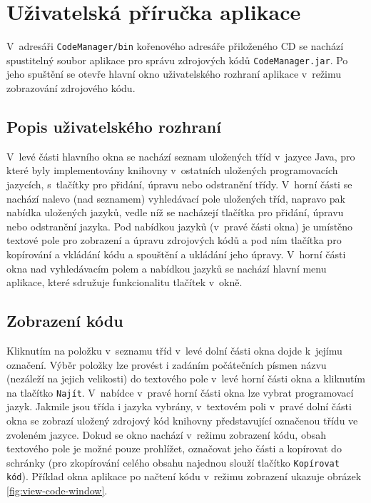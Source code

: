 \documentclass[czech,BP]{thesiskiv}
\begin{document}
    

\chapter{Uživatelská příručka aplikace}
V~adresáři \texttt{CodeManager/bin} kořenového adresáře přiloženého CD se nachází spustitelný soubor aplikace pro správu zdrojových kódů \texttt{CodeManager.jar}. Po jeho spuštění se otevře hlavní okno uživatelského rozhraní aplikace v~režimu zobrazování zdrojového kódu.\par

\section{Popis uživatelského rozhraní}
V~levé části hlavního okna se nachází seznam uložených tříd v~jazyce Java, pro které byly implementovány knihovny v~ostatních uložených programovacích jazycích, s~tlačítky pro přidání, úpravu nebo odstranění třídy. V~horní části se nachází nalevo (nad seznamem) vyhledávací pole uložených tříd, napravo pak nabídka uložených jazyků, vedle níž se nacházejí tlačítka pro přidání, úpravu nebo odstranění jazyka. Pod nabídkou jazyků (v~pravé části okna) je umístěno textové pole pro zobrazení a úpravu zdrojových kódů a pod ním tlačítka pro kopírování a vkládání kódu a spouštění a ukládání jeho úpravy. V~horní části okna nad vyhledávacím polem a nabídkou jazyků se nachází hlavní menu aplikace, které sdružuje funkcionalitu tlačítek v~okně.

\section{Zobrazení kódu}
Kliknutím na položku v~seznamu tříd v~levé dolní části okna dojde k~jejímu označení. Výběr položky lze provést i zadáním počátečních písmen názvu (nezáleží na jejich velikosti) do textového pole v~levé horní části okna a kliknutím na tlačítko \texttt{Najít}. V~nabídce v~pravé horní části okna lze vybrat programovací jazyk. Jakmile jsou třída i jazyka vybrány, v~textovém poli v~pravé dolní části okna se zobrazí uložený zdrojový kód knihovny představující označenou třídu ve zvoleném jazyce. Dokud se okno nachází v~režimu zobrazení kódu, obsah textového pole je možné pouze prohlížet, označovat jeho části a kopírovat do schránky (pro zkopírování celého obsahu najednou slouží tlačítko \texttt{Kopírovat kód}). Příklad okna aplikace po načtení kódu v~režimu zobrazení ukazuje obrázek \ref{fig:view-code-window}.
\end{document}
